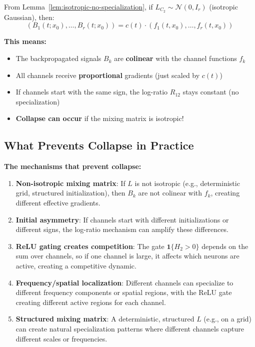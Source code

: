 From Lemma~\ref{lem:isotropic-no-specialization}, if $L_{C_2} \sim \mathcal{N}(0, I_r)$ (isotropic Gaussian), then:
\[
(B_1(t; x_0), \ldots, B_r(t; x_0)) = c(t) \cdot (f_1(t, x_0), \ldots, f_r(t, x_0))
\]

\textbf{This means:}
\begin{itemize}
\item The backpropagated signals $B_k$ are \textbf{colinear} with the channel functions $f_k$
\item All channels receive \textbf{proportional} gradients (just scaled by $c(t)$)
\item If channels start with the same sign, the log-ratio $R_{12}$ stays constant (no specialization)
\item \textbf{Collapse can occur} if the mixing matrix is isotropic!
\end{itemize}

\subsection{What Prevents Collapse in Practice}

\textbf{The mechanisms that prevent collapse:}

\begin{enumerate}
\item \textbf{Non-isotropic mixing matrix}: If $L$ is not isotropic (e.g., deterministic grid, structured initialization), then $B_k$ are not colinear with $f_k$, creating different effective gradients.

\item \textbf{Initial asymmetry}: If channels start with different initializations or different signs, the log-ratio mechanism can amplify these differences.

\item \textbf{ReLU gating creates competition}: The gate $\mathbf{1}\{H_2 > 0\}$ depends on the sum over channels, so if one channel is large, it affects which neurons are active, creating a competitive dynamic.

\item \textbf{Frequency/spatial localization}: Different channels can specialize to different frequency components or spatial regions, with the ReLU gate creating different active regions for each channel.

\item \textbf{Structured mixing matrix}: A deterministic, structured $L$ (e.g., on a grid) can create natural specialization patterns where different channels capture different scales or frequencies.
\end{enumerate}

